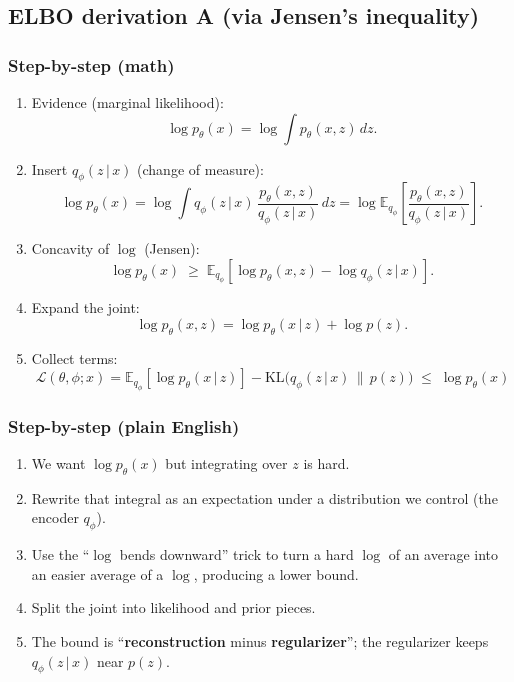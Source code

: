 \documentclass[11pt]{article}
\newcommand{\E}{\mathbb{E}}
\newcommand{\KL}{\mathrm{KL}}
\newcommand{\given}{\,\vert\,}
\theoremstyle{remark}
\begin{document}
\subsection{ELBO derivation A (via Jensen's inequality)}
\subsubsection*{Step-by-step (math)}
\begin{enumerate}[leftmargin=1.6em]
  \item Evidence (marginal likelihood):
  \[
  \log p_\theta(x)=\log \int p_\theta(x,z)\,dz.
  \]
  \item Insert $q_\phi(z\given x)$ (change of measure):
  \[
  \log p_\theta(x)
  = \log \int q_\phi(z\given x)\,\frac{p_\theta(x,z)}{q_\phi(z\given x)}\,dz
  = \log \E_{q_\phi}\!\left[\frac{p_\theta(x,z)}{q_\phi(z\given x)}\right].
  \]
  \item Concavity of $\log$ (Jensen):
  \[
  \log p_\theta(x)\;\ge\; \E_{q_\phi}\!\left[\log p_\theta(x,z)-\log q_\phi(z\given x)\right].
  \]
  \item Expand the joint:
  \[
  \log p_\theta(x,z)=\log p_\theta(x\given z)+\log p(z).
  \]
  \item Collect terms:
  \[
  \boxed{\;
  \mathcal L(\theta,\phi;x)
  = \E_{q_\phi}[\log p_\theta(x\given z)]
  - \KL\!\big(q_\phi(z\given x)\,\|\,p(z)\big)
  \;\le\; \log p_\theta(x)\;}
  \]
\end{enumerate}

\subsubsection*{Step-by-step (plain English)}
\begin{enumerate}[leftmargin=1.6em]
  \item We want $\log p_\theta(x)$ but integrating over $z$ is hard.
  \item Rewrite that integral as an expectation under a distribution we control (the encoder $q_\phi$).
  \item Use the ``$\log$ bends downward'' trick to turn a hard $\log$ of an average into an easier average of a $\log$, producing a lower bound.
  \item Split the joint into likelihood and prior pieces.
  \item The bound is ``\textbf{reconstruction} minus \textbf{regularizer}''; the regularizer keeps $q_\phi(z\given x)$ near $p(z)$.
\end{enumerate}
\end{document}

